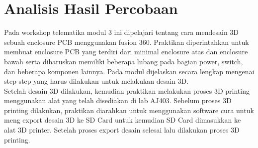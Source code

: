 \section*{Analisis Hasil Percobaan}
\indent
Pada workshop telematika modul 3 ini dipelajari tentang cara mendesain 3D sebuah enclosure PCB menggunakan fusion 360. Praktikan diperintahkan untuk membuat enclosure PCB yang terdiri dari minimal enclosure atas dan enclosure bawah serta diharuskan memiliki beberapa lubang pada bagian power, switch, dan beberapa komponen lainnya.  Pada modul dijelaskan secara lengkap mengenai step-step yang harus dilakukan untuk melakukan desain 3D.
\\ \indent 
Setelah desain 3D dilakukan, kemudian praktikan melakukan proses 3D printing menggunakan alat yang telah disediakan di lab AJ403. Sebelum proses 3D printing dilakukan, praktikan diarahkan untuk menggunakan software cura untuk meng export desain 3D ke SD Card untuk kemudian SD Card dimasukkan ke alat 3D printer. Setelah proses export desain selesai lalu dilakukan proses 3D printing.


